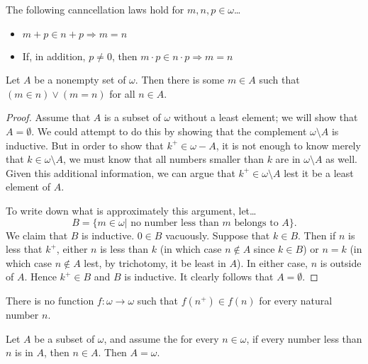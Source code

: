 \begin{corollary}
The following canncellation laws hold for $m,n,p \in \omega$\dots
\begin{itemize}
  \item $m + p \in n + p \Rightarrow m = n$
  \item If, in addition, $p \neq 0$, then $m \cdot p \in n \cdot p \Rightarrow m = n$
\end{itemize}
\end{corollary}

\begin{theorem}\label{wellorderingofnaturalnumbers}
Let $A$ be a nonempty set of $\omega.$ Then there is some $m \in A$ such that $(m \in n) \lor (m=n)$ for all $n \in A$.
\end{theorem}

\begin{proof}
Assume that $A$ is a subset of $\omega$ without a least element; we will 
show that $A = \emptyset$. We could attempt to do this by showing that the complement
$\omega \setminus A$ is inductive. But in order to show that $k^+ \in \omega - A$,
it is not enough to know merely that $k \in \omega \setminus A$, we must know
that all numbers smaller than $k$ are in $\omega \setminus A$ as well. Given this additional
information, we can argue that $k^+ \in \omega \setminus A$ lest it be a least element of $A$.

To write down what is approximately this argument, let\dots
$$B = \{m \in \omega | \textrm{ no number less than } m \textrm{ belongs to } A \}.$$
We claim that $B$ is inductive. $0 \in B$ vacuously. Suppose that $k \in B$. Then if 
$n$ is less that $k^+$, either $n$ is less than $k$ (in which case $n \not\in A$ since $k \in B$) or
$n = k$ (in which case $n \not\in A$ lest, by trichotomy, it be least in $A$). In either case, 
$n$ is outside of $A$. Hence $k^+ \in B$ and $B$ is inductive. It clearly follows that
$A = \emptyset$.
\end{proof}

\begin{corollary}
There is no function $f : \omega \rightarrow \omega$ such that $f(n^+) \in f(n)$
for every natural number $n$.
\end{corollary}

\begin{theorem}
Let $A$ be a subset of $\omega$, and assume the for every $n \in \omega$, if
every number less than $n$ is in $A$, then $n \in A.$ Then $A = \omega$.
\end{theorem}
